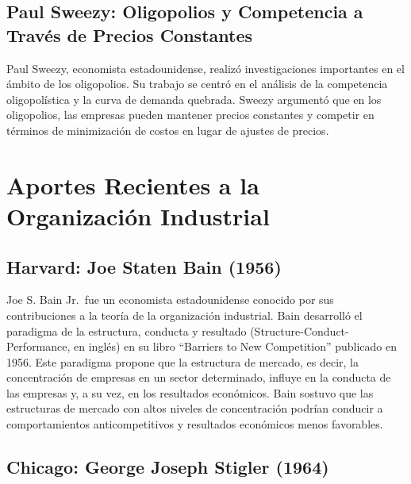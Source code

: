 \documentclass[
  letterpaper,
  DIV=11,
  numbers=noendperiod]{scrartcl}
\begin{document}
\hypertarget{paul-sweezy-oligopolios-y-competencia-a-travuxe9s-de-precios-constantes}{%
\subsection{Paul Sweezy: Oligopolios y Competencia a Través de Precios
Constantes}\label{paul-sweezy-oligopolios-y-competencia-a-travuxe9s-de-precios-constantes}}

Paul Sweezy, economista estadounidense, realizó investigaciones
importantes en el ámbito de los oligopolios. Su trabajo se centró en el
análisis de la competencia oligopolística y la curva de demanda
quebrada. Sweezy argumentó que en los oligopolios, las empresas pueden
mantener precios constantes y competir en términos de minimización de
costos en lugar de ajustes de precios.

\hypertarget{aportes-recientes-a-la-organizaciuxf3n-industrial}{%
\section{Aportes Recientes a la Organización
Industrial}\label{aportes-recientes-a-la-organizaciuxf3n-industrial}}

\hypertarget{harvard-joe-staten-bain-1956}{%
\subsection{Harvard: Joe Staten Bain
(1956)}\label{harvard-joe-staten-bain-1956}}

Joe S. Bain Jr.~fue un economista estadounidense conocido por sus
contribuciones a la teoría de la organización industrial. Bain
desarrolló el paradigma de la estructura, conducta y resultado
(Structure-Conduct-Performance, en inglés) en su libro ``Barriers to New
Competition'' publicado en 1956. Este paradigma propone que la
estructura de mercado, es decir, la concentración de empresas en un
sector determinado, influye en la conducta de las empresas y, a su vez,
en los resultados económicos. Bain sostuvo que las estructuras de
mercado con altos niveles de concentración podrían conducir a
comportamientos anticompetitivos y resultados económicos menos
favorables.

\hypertarget{chicago-george-joseph-stigler-1964}{%
\subsection{Chicago: George Joseph Stigler
(1964)}\label{chicago-george-joseph-stigler-1964}}
\end{document}
